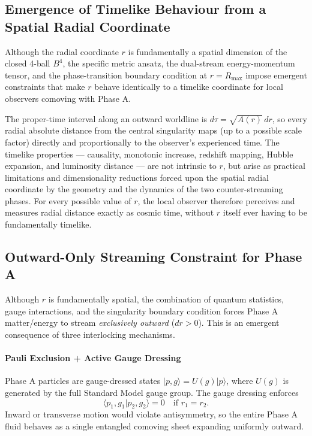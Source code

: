 \documentclass[10pt,twocolumn]{article}
\theoremstyle{definition}
\newcommand{\Rmax}{R_{\max}}
\begin{document}
\subsection{Emergence of Timelike Behaviour from a Spatial Radial Coordinate}

Although the radial coordinate \( r \) is fundamentally a spatial dimension of the closed 4-ball \( B^4 \), the specific metric ansatz, the dual-stream energy-momentum tensor, and the phase-transition boundary condition at \( r = \Rmax \) impose emergent constraints that make \( r \) behave identically to a timelike coordinate for local observers comoving with Phase A.

The proper-time interval along an outward worldline is \( d\tau = \sqrt{A(r)}\,dr \), so every radial absolute distance from the central singularity maps (up to a possible scale factor) directly and proportionally to the observer’s experienced time. The timelike properties — causality, monotonic increase, redshift mapping, Hubble expansion, and luminosity distance — are not intrinsic to \( r \), but arise as practical limitations and dimensionality reductions forced upon the spatial radial coordinate by the geometry and the dynamics of the two counter-streaming phases. For every possible value of \( r \), the local observer therefore perceives and measures radial distance exactly as cosmic time, without \( r \) itself ever having to be fundamentally timelike.



\subsection{Outward-Only Streaming Constraint for Phase A}

Although \( r \) is fundamentally spatial, the combination of quantum statistics, gauge interactions, and the singularity boundary condition forces Phase A matter/energy to stream \emph{exclusively outward} (\( dr > 0 \)). This is an emergent consequence of three interlocking mechanisms.

\paragraph{Pauli Exclusion + Active Gauge Dressing}  
Phase A particles are gauge-dressed states \( |p, g\rangle = U(g)|p\rangle \), where \( U(g) \) is generated by the full Standard Model gauge group. The gauge dressing enforces
\[
\langle p_1, g_1 | p_2, g_2 \rangle = 0 \quad \text{if } r_1 = r_2.
\]
Inward or transverse motion would violate antisymmetry, so the entire Phase A fluid behaves as a single entangled comoving sheet expanding uniformly outward.
\end{document}
